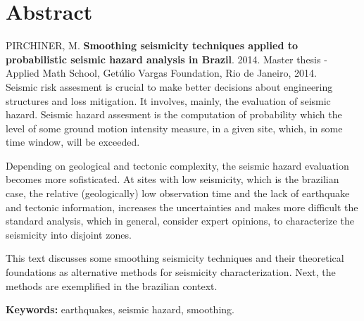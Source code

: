 \documentclass[12pt,twoside,a4paper]{book}
\numberwithin{equation}{section}
\begin{document}
\chapter*{Abstract}
\noindent PIRCHINER, M. \textbf{Smoothing seismicity techniques applied to probabilistic seismic
hazard analysis in Brazil}.
2014.
Master thesis - Applied Math School,
Getúlio Vargas Foundation, Rio de Janeiro, 2014.
\\

Seismic risk assesment is crucial to make better decisions about engineering structures and loss mitigation.
It involves, mainly, the evaluation of seismic hazard.
Seismic hazard assesment is the computation of probability which the level of some ground
motion intensity measure, in a given site, which, in some time window, will be exceeded.

Depending on geological and tectonic complexity, the seismic hazard evaluation becomes more sofisticated.
At sites with low seismicity, which is the brazilian case, the relative (geologically) low observation time
and the lack of earthquake and tectonic information, increases the uncertainties and makes more difficult
the standard analysis, which in general, consider expert opinions, to characterize the
seismicity into disjoint zones. 

This text discusses some smoothing seismicity techniques and their theoretical foundations as alternative
methods for seismicity characterization. Next, the methods are exemplified in the brazilian context.

\noindent \textbf{Keywords:} earthquakes, seismic hazard, smoothing.

\tableofcontents    %

\printglossary[type=\acronymtype,title=Lista de Abreviaturas]

\printglossary[type=symbols,title=Lista de S\'imbolos]



\end{document}
